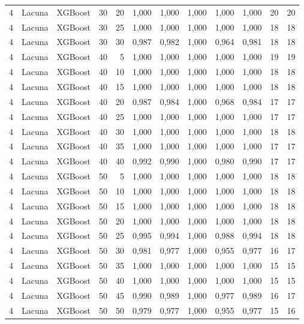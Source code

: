 \begin{longtable}{@{}rllrrrrrrrrr@{}}
4 & Lacuna & XGBoost & 30 & 20 & 1,000 & 1,000 & 1,000 & 1,000 & 1,000 & 20 & 20 \\
4 & Lacuna & XGBoost & 30 & 25 & 1,000 & 1,000 & 1,000 & 1,000 & 1,000 & 18 & 18 \\
4 & Lacuna & XGBoost & 30 & 30 & 0,987 & 0,982 & 1,000 & 0,964 & 0,981 & 18 & 18 \\
4 & Lacuna & XGBoost & 40 & 5 & 1,000 & 1,000 & 1,000 & 1,000 & 1,000 & 19 & 19 \\
4 & Lacuna & XGBoost & 40 & 10 & 1,000 & 1,000 & 1,000 & 1,000 & 1,000 & 18 & 18 \\
4 & Lacuna & XGBoost & 40 & 15 & 1,000 & 1,000 & 1,000 & 1,000 & 1,000 & 18 & 18 \\
4 & Lacuna & XGBoost & 40 & 20 & 0,987 & 0,984 & 1,000 & 0,968 & 0,984 & 17 & 17 \\
4 & Lacuna & XGBoost & 40 & 25 & 1,000 & 1,000 & 1,000 & 1,000 & 1,000 & 17 & 17 \\
4 & Lacuna & XGBoost & 40 & 30 & 1,000 & 1,000 & 1,000 & 1,000 & 1,000 & 18 & 18 \\
4 & Lacuna & XGBoost & 40 & 35 & 1,000 & 1,000 & 1,000 & 1,000 & 1,000 & 17 & 17 \\
4 & Lacuna & XGBoost & 40 & 40 & 0,992 & 0,990 & 1,000 & 0,980 & 0,990 & 17 & 17 \\
4 & Lacuna & XGBoost & 50 & 5 & 1,000 & 1,000 & 1,000 & 1,000 & 1,000 & 18 & 18 \\
4 & Lacuna & XGBoost & 50 & 10 & 1,000 & 1,000 & 1,000 & 1,000 & 1,000 & 18 & 18 \\
4 & Lacuna & XGBoost & 50 & 15 & 1,000 & 1,000 & 1,000 & 1,000 & 1,000 & 18 & 18 \\
4 & Lacuna & XGBoost & 50 & 20 & 1,000 & 1,000 & 1,000 & 1,000 & 1,000 & 18 & 18 \\
4 & Lacuna & XGBoost & 50 & 25 & 0,995 & 0,994 & 1,000 & 0,988 & 0,994 & 18 & 18 \\
4 & Lacuna & XGBoost & 50 & 30 & 0,981 & 0,977 & 1,000 & 0,955 & 0,977 & 16 & 17 \\
4 & Lacuna & XGBoost & 50 & 35 & 1,000 & 1,000 & 1,000 & 1,000 & 1,000 & 15 & 15 \\
4 & Lacuna & XGBoost & 50 & 40 & 1,000 & 1,000 & 1,000 & 1,000 & 1,000 & 15 & 15 \\
4 & Lacuna & XGBoost & 50 & 45 & 0,990 & 0,989 & 1,000 & 0,977 & 0,989 & 16 & 17 \\
4 & Lacuna & XGBoost & 50 & 50 & 0,979 & 0,977 & 1,000 & 0,955 & 0,977 & 15 & 16 \\

\end{longtable}
